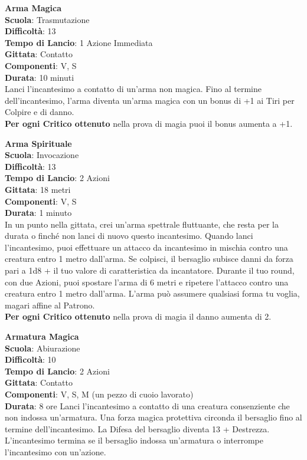 \begin{multicols}{2}
\medskip\textbf{Arma Magica}\\
\textbf{Scuola}: Trasmutazione\\
\textbf{Difficoltà}: 13\\
\textbf{Tempo di Lancio}: 1 Azione Immediata\\
\textbf{Gittata}: Contatto\\
\textbf{Componenti}: V, S\\
\textbf{Durata}: 10 minuti\\
Lanci l'incantesimo a contatto di un'arma non magica. Fino al termine dell'incantesimo, l'arma diventa un'arma magica con un bonus di +1 ai Tiri per Colpire e di danno.\\
\textbf{Per ogni Critico ottenuto} nella prova di magia puoi il bonus aumenta a +1.

\medskip\textbf{Arma Spirituale}\\
\textbf{Scuola}: Invocazione\\
\textbf{Difficoltà}: 13\\
\textbf{Tempo di Lancio}: 2 Azioni\\
\textbf{Gittata}: 18 metri\\
\textbf{Componenti}: V, S\\
\textbf{Durata}: 1 minuto\\
In un punto nella gittata, crei un'arma spettrale fluttuante, che resta per la durata o finché non lanci di nuovo questo incantesimo. Quando lanci l'incantesimo, puoi effettuare un attacco da incantesimo in mischia contro una creatura entro 1 metro dall'arma. Se colpisci, il bersaglio subisce danni da forza pari a 1d8 + il tuo valore di caratteristica da incantatore. Durante il tuo round, con due Azioni, puoi spostare l'arma di 6 metri e ripetere l'attacco contro una creatura entro 1 metro dall'arma. L'arma può assumere qualsiasi forma tu voglia, magari affine al Patrono.\\
\textbf{Per ogni Critico ottenuto} nella prova di magia il danno aumenta di 2.

\medskip\textbf{Armatura Magica}\\
\textbf{Scuola}: Abiurazione\\
\textbf{Difficoltà}: 10\\
\textbf{Tempo di Lancio}: 2 Azioni\\
\textbf{Gittata}: Contatto\\
\textbf{Componenti}: V, S, M (un pezzo di cuoio lavorato)\\
\textbf{Durata}: 8 ore
Lanci l'incantesimo a contatto di una creatura consenziente che non indossa un'armatura. Una forza magica protettiva circonda il bersaglio fino al termine dell'incantesimo. La Difesa del bersaglio diventa 13 + Destrezza. L'incantesimo termina se il bersaglio indossa un'armatura o interrompe l'incantesimo con un'azione.



\end{multicols}
